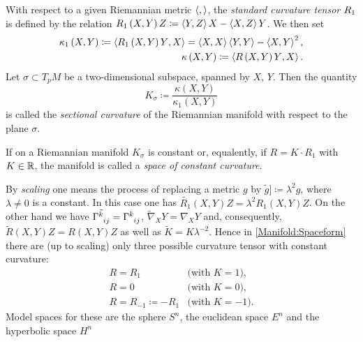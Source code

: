 \documentclass[../main.tex]{subfiles}
\begin{document}
\begin{definition}
With respect to a given Riemannian metric \(\left\langle{},{}\right\rangle\),
the \textit{standard curvature tensor} \(\tensor{{R_1}}{}\) is defined by the relation
\(R_1\left(X,Y\right)Z\coloneqq\left\langle{Y},{Z}\right\rangle X-\left\langle{X},{Z}\right\rangle Y\).
We then set
\begin{align*}
\kappa_1\left(X,Y\right)
\coloneqq\left\langle{R_1\left(X,Y\right)Y},{X}\right\rangle
=\left\langle{X},{X}\right\rangle\left\langle{Y},{Y}\right\rangle-\left\langle{X},{Y}\right\rangle^2\text{,}\\
\kappa\left(X,Y\right)
\coloneqq\left\langle{R\left(X,Y\right)Y},{X}\right\rangle\text{.}
\end{align*}
Let \(\sigma\subset T_pM\) be a two-dimensional subspace, spanned by \(X\), \(Y\).
Then the quantity
\[
K_\sigma
\coloneqq
\frac{\kappa\left(X,Y\right)}{\kappa_1\left(X,Y\right)}
\]
is called the \textit{sectional curvature} of the Riemannian manifold with respect to the plane \(\sigma\).
\end{definition}
\begin{definition}\label{Manifold:Spaceform}
If on a Riemannian manifold \(K_\sigma\) is constant
or, equalently,
if \(R=K\cdot R_1\) with \(K\in\mathbb{R}\),
the manifold is called a \textit{space of constant curvature}.
\end{definition}
\begin{remark}
By \textit{scaling} one means the process of
replacing a metric \(g\) by \(\tilde{g}]\coloneqq\lambda^2g\), where \(\lambda\ne0\) is a constant.
In this case one has \(\tilde{R_1}\left(X,Y\right)Z=\lambda^2R_1\left(X,Y\right)Z\).
On the other hand we have
\(\tilde{\tensor{\Gamma}{^k_i_j}}=\tensor{\Gamma}{^k_i_j}\),
\(\tilde{\nabla}_XY=\nabla_XY\) and, consequently,
\(\tilde{R}\left(X,Y\right)Z=R\left(X,Y\right)Z\)
as well as \(\tilde{K}=K\lambda^{-2}\).
Hence in \cref{Manifold:Spaceform} there are (up to scaling) only three possible curvature tensor with constant curvature:
\begin{align*}
R=R_1&\text{(with \(K=1\)),}\\
R=0&\text{(with \(K=0\)),}\\
R=R_{-1}\coloneqq-R_1&\text{(with \(K=-1\)).}
\end{align*}
Model spaces for these are the sphere \(S^n\), the euclidean space \(E^n\) and the hyperbolic space \(H^n\)
\end{remark}
\end{document}
